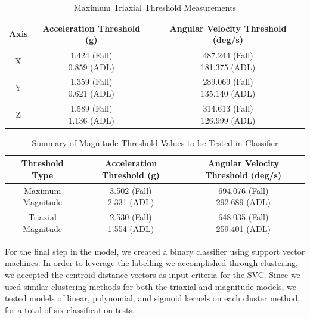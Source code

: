 \documentclass{llncs}
\begin{document}
\begin{table}
	\begin{center}
		\caption{Maximum Triaxial Threshold Measurements}
		\label{table4}
		\begin{tabular}{|c|c|c|}
			\toprule
			Axis & Acceleration Threshold (g) & Angular Velocity Threshold (deg/s)\\
			\midrule
			X & \makecell{1.424 (Fall)\\0.859 (ADL)} & \makecell{487.244 (Fall)\\181.375 (ADL)}\\
			Y & \makecell{1.359 (Fall)\\0.621 (ADL)} & \makecell{289.069 (Fall)\\135.140 (ADL)}\\
			Z & \makecell{1.589 (Fall)\\1.136 (ADL)} & \makecell{314.613 (Fall)\\126.999 (ADL)}\\
			\bottomrule
		\end{tabular}
	\end{center}
\end{table}
	
 \begin{table}
 	\begin{center}
		\caption{Summary of Magnitude Threshold Values to be Tested in Classifier}
		\label{table5}
		\begin{tabular}{|c|c|c|}
			\toprule
			Threshold Type & Acceleration Threshold (g) & Angular Velocity Threshold (deg/s)\\
			\midrule
			Maximum Magnitude & \makecell{3.502 (Fall) \\2.331 (ADL)} & \makecell{694.076 (Fall) \\292.689 (ADL)}\\
			Triaxial Magnitude & \makecell{2.530 (Fall) \\1.554 (ADL)} & \makecell{648.035 (Fall) \\259.401 (ADL)}\\
			\bottomrule
		\end{tabular}
 	\end{center}
\end{table} 
    
    For the final step in the model, we created a binary classifier using support vector machines. In order to leverage the labelling we accomplished through clustering, we accepted the centroid distance vectors as input criteria for the SVC. Since we used similar clustering methods for both the triaxial and magnitude models, we tested models of linear, polynomial, and sigmoid kernels on each cluster method, for a total of six classification tests. 
    
\end{document}
